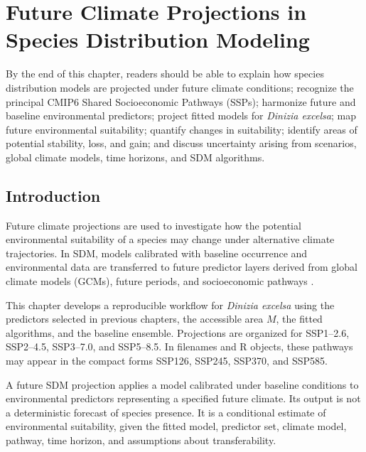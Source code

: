 \chapter[Future climate projections]{Future Climate Projections in Species Distribution Modeling}

\begin{objetivos}
By the end of this chapter, readers should be able to explain how species distribution models are projected under future climate conditions; recognize the principal CMIP6 Shared Socioeconomic Pathways (SSPs); harmonize future and baseline environmental predictors; project fitted models for \textit{Dinizia excelsa}; map future environmental suitability; quantify changes in suitability; identify areas of potential stability, loss, and gain; and discuss uncertainty arising from scenarios, global climate models, time horizons, and SDM algorithms.
\end{objetivos}

\section{Introduction}

Future climate projections are used to investigate how the potential environmental suitability of a species may change under alternative climate trajectories. In SDM, models calibrated with baseline occurrence and environmental data are transferred to future predictor layers derived from global climate models (GCMs), future periods, and socioeconomic pathways \parencite{guisan2017habitat,ipcc2021,araujo2006climate,thuiller2005climate}.

This chapter develops a reproducible workflow for \textit{Dinizia excelsa} using the predictors selected in previous chapters, the accessible area \(M\), the fitted algorithms, and the baseline ensemble. Projections are organized for SSP1--2.6, SSP2--4.5, SSP3--7.0, and SSP5--8.5. In filenames and R objects, these pathways may appear in the compact forms SSP126, SSP245, SSP370, and SSP585.

\begin{conceito}[title={\faBook\quad Future climate projection}]
A future SDM projection applies a model calibrated under baseline conditions to environmental predictors representing a specified future climate. Its output is not a deterministic forecast of species presence. It is a conditional estimate of environmental suitability, given the fitted model, predictor set, climate model, pathway, time horizon, and assumptions about transferability.
\end{conceito}

